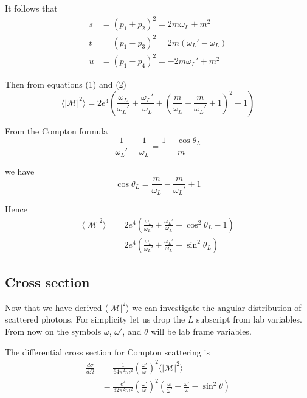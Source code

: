 \documentclass[12pt]{article}
\begin{document}
\noindent
It follows that
\begin{equation*}
\begin{aligned}
s&=(p_1+p_2)^2=2m\omega_L+m^2
\\
t&=(p_1-p_3)^2=2m(\omega_L' - \omega_L)
\\
u&=(p_1-p_4)^2=-2 m \omega_L' + m^2
\end{aligned}
\end{equation*}

Then from equations (1) and (2)
\begin{equation*}
\langle|\mathcal{M}|^2\rangle=
2e^4\left(
\frac{\omega_L}{\omega_L'}+\frac{\omega_L'}{\omega_L}
+\left(\frac{m}{\omega_L}-\frac{m}{\omega_L'}+1\right)^2-1
\right)
\end{equation*}

\noindent
From the Compton formula
\begin{equation*}
\frac{1}{\omega_L'}-\frac{1}{\omega_L}=\frac{1-\cos\theta_L}{m}
\end{equation*}

\noindent
we have
\begin{equation*}
\cos\theta_L=\frac{m}{\omega_L}-\frac{m}{\omega_L'}+1
\end{equation*}

\noindent
Hence
\begin{align*}
\langle|\mathcal{M}|^2\rangle
&=2e^4\left(
\frac{\omega_L}{\omega_L'}+\frac{\omega_L'}{\omega_L}+\cos^2\theta_L-1
\right)
\\
&=2e^4\left(
\frac{\omega_L}{\omega_L'}+\frac{\omega_L'}{\omega_L}-\sin^2\theta_L
\right)
\end{align*}

\subsection*{Cross section}
Now that we have derived $\langle|\mathcal{M}|^2\rangle$
we can investigate the angular distribution of scattered photons.
For simplicity let us drop the $L$ subscript from lab variables.
From now on the symbols $\omega$, $\omega'$, and $\theta$ will be lab frame variables.

\bigskip
\noindent
The differential cross section for Compton scattering is
\begin{align*}
\frac{d\sigma}{d\Omega}&=\frac{1}{64\pi^2m^2}
\left(\frac{\omega'}{\omega}\right)^2\langle|\mathcal{M}|^2\rangle
\\
&=\frac{e^4}{32\pi^2m^2}
\left(\frac{\omega'}{\omega}\right)^2
\left(
\frac{\omega}{\omega'}+\frac{\omega'}{\omega}-\sin^2\theta
\right)
\end{align*}
\end{document}
